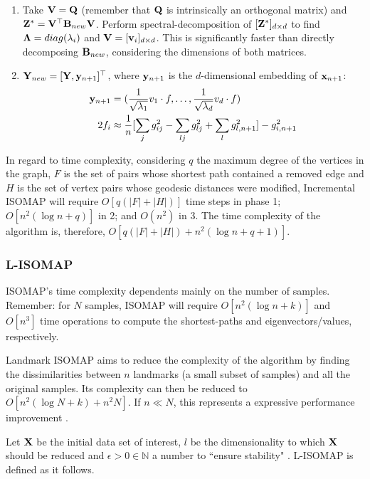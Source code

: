 \begin{enumerate}
\begin{enumerate}
		\item Take $\mathbf{V=Q}$ (remember that $\mathbf{Q}$ is intrinsically an orthogonal matrix) and $\mathbf{Z^*=V^\top} \mathbf{B}_{new} \mathbf{V}$. Perform spectral-decomposition of $[\mathbf{Z}^*]_{d \times d}$ to find $\mathbf{\Lambda} = diag(\lambda_i)$ and $\mathbf{V} = [\mathbf{v}_i]_{d \times d}$. This is significantly faster than directly decomposing $\mathbf{B}_{new}$, considering the dimensions of both matrices. 

		\item $\mathbf{Y}_{new} = [\mathbf{Y}, \mathbf{y}_{n+1}]^\top$, where $\mathbf{y}_{n+1}$ is the $d$-dimensional embedding of $\mathbf{x}_{n+1}$:
		\begin{align*}
			\mathbf{y}_{n+1} &= (\frac{1}{\sqrt{\lambda_1}} v_1 \cdot f, \dots, \frac{1}{\sqrt{\lambda_d}} v_d \cdot f) \\
			2f_i &\approx \frac{1}{n}[\sum_j g_{ij}^2 - \sum_{lj} g_{lj}^2 + \sum_l g_{l, n+1}^2] -g_{i, n+1}^2
		\end{align*}
	\end{enumerate}
\end{enumerate}

In regard to time complexity, considering $q$ the maximum degree of the vertices in the graph, $F$ is the set of pairs whose shortest path contained a removed edge and $H$ is the set of vertex pairs whose geodesic distances were modified, Incremental ISOMAP will require $O[q(|F|+|H|)]$ time steps in phase 1; $O[n^2(\log n + q)]$ in 2; and $O(n^2)$ in 3. The time complexity of the algorithm is, therefore, $O[q(|F|+|H|) + n^2(\log n + q + 1)]$.

\subsubsection{L-ISOMAP}
\label{sec:lisomap}

ISOMAP's time complexity dependents mainly on the number of samples. Remember: for $N$ samples, ISOMAP will require $O[n^2(\log n + k)]$ and $O[n^3]$ time operations to compute the shortest-paths and eigenvectors/values, respectively.

Landmark ISOMAP aims to reduce the complexity of the algorithm by finding the dissimilarities between $n$ landmarks (a small subset of samples) and all the original samples. Its complexity can then be reduced to $O[n^2(\log N + k) + n^2N]$. If $n \ll N$, this represents a expressive performance improvement \cite{silva2002global}.

Let $\mathbf{X}$ be the initial data set of interest, $l$ be the dimensionality to which $\mathbf{X}$ should be reduced and $\epsilon > 0 \in \mathbb{N}$ a number to ``ensure stability" \cite{silva2002global}. L-ISOMAP is defined as it follows.


